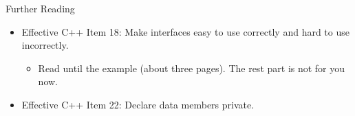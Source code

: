 \documentclass{beamer}
\begin{document}
\begin{frame}{Further Reading}
    \begin{itemize}
        \item Effective C++ Item 18: Make interfaces easy to use correctly and hard to use incorrectly.
        \begin{itemize}
            \item Read until the  example (about three pages). The rest part is not for you now.
        \end{itemize}
        \item Effective C++ Item 22: Declare data members private.
    \end{itemize}
\end{frame}
\end{document}
